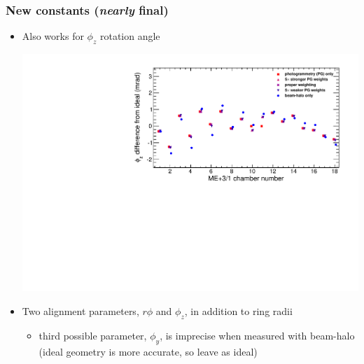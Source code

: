 \documentclass[compress]{beamer}
\begin{document}
\begin{frame}
\frametitle{New constants ({\it nearly} final)}

\begin{itemize}
\item Also works for $\phi_z$ rotation angle

\includegraphics[width=\linewidth]{dependence_on_weights_p31phiz.pdf}

\item Two alignment parameters, $r\phi$ and $\phi_z$, in addition to ring radii
\begin{itemize}
\item third possible parameter, $\phi_y$, is imprecise when measured
  with beam-halo (ideal geometry is more accurate, so leave as ideal)
\end{itemize}
\end{itemize}
\end{frame}
\end{document}
